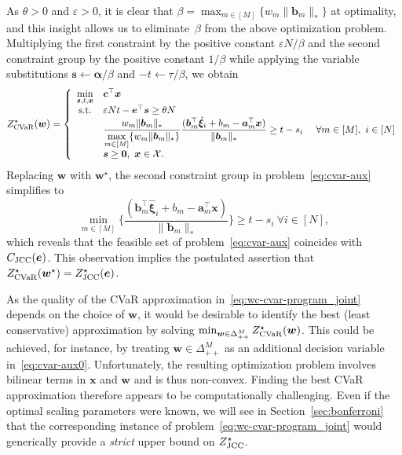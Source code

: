 \documentclass[nonblindrev]{informs2017}
\newcommand{\bmh}[1]{\hat{\bm{#1}}}
\newcommand{\1}[1]{\mathds{1}{\left(#1\right)}}
\begin{document}
As $\theta > 0$ and $\varepsilon>0$, it is clear that $\beta = \max_{m \in [M]} \{w_m\|\bm{b}_m\|_*\}$ at optimality, and this insight allows us to eliminate~$\beta$ from the above optimization problem. Multiplying the first constraint by the positive constant $\varepsilon N/\beta$ and the second constraint group by the positive constant $1/\beta$ while applying the variable substitutions $\bm{s} \leftarrow \bm{\alpha}/\beta$ and $-t \leftarrow \tau/\beta$, we obtain
\begin{equation}
\label{eq:cvar-aux}
Z^\star_{\rm CVaR}(\bm{w}) =\left\{ 
\begin{array}{cll}
\displaystyle \min_{\bm s, t, \bm{x}} & \bm{c}^\top\bm{x} \\
{\rm s.t.} & \varepsilon N t - \bm{e}^\top\bm{s} \geq \theta N \\
& \dfrac{w_m\|\bm{b}_m\|_*}{\max\limits_{m \in [M]} \{w_m\|\bm{b}_m\|_*\}}\dfrac{(\bm{b}^\top_m\bmh{\xi}_i + b_m - \bm{a}^\top_m\bm{x})}{\|\bm{b}_m\|_*} \geq t - s_i &~\forall m \in [M], ~i \in [N] \\
& \bm{s} \geq \bm{0}, ~\bm{x} \in \mathcal{X}.
\end{array}\right.
\end{equation}
Replacing $\bm{w}$ with $\bm{w}^\star$, the second constraint group in problem~\eqref{eq:cvar-aux} simplifies to
$$
\min_{m \in [M]} \Bigg\{\dfrac{(\bm{b}^\top_m\bmh{\xi}_i + b_m - \bm{a}^\top_m\bm{x})}{\|\bm{b}_m\|_*}\Bigg\} \geq t - s_i ~\forall i \in [N],
$$
which reveals that the feasible set of problem~\eqref{eq:cvar-aux} coincides with $C_{\rm JCC}(\bm e)$. This observation implies the postulated assertion that $Z^\star_{\rm CVaR}(\bm{w}^\star) = Z^\star_{\rm JCC}(\bm e)$.
\hfill \Halmos
\endproof

As the quality of the CVaR approximation in~\eqref{eq:wc-cvar-program_joint} depends on the choice of $\bm w$, it would be desirable to identify the best (least conservative)  approximation by solving $\min_{\bm w\in \Delta_{++}^M}Z^\star_{\rm CVaR}(\bm{w})$. This could be achieved, for instance, by treating $\bm w\in \Delta_{++}^M$ as an additional decision variable in~\eqref{eq:cvar-aux0}. Unfortunately, the resulting optimization problem involves bilinear terms in $\bm x$ and $\bm w$ and is thus non-convex. Finding the best CVaR approximation therefore appears to be computationally challenging. Even if the optimal scaling parameters were known, we will see in Section~\ref{sec:bonferroni} that the corresponding instance of problem~\eqref{eq:wc-cvar-program_joint} would generically provide a {\em strict} upper bound on $Z^\star_{\rm JCC}$.
\end{document}
